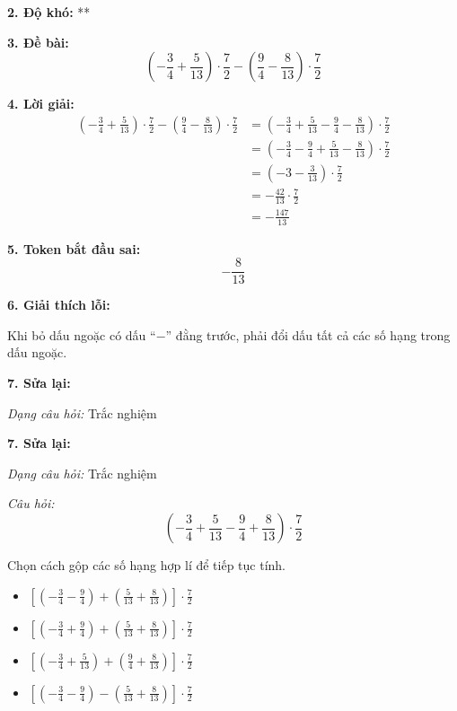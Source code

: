 \noindent\textbf{2. Độ khó:} **

\noindent\textbf{3. Đề bài:}
\[
\left(-\frac{3}{4}+\frac{5}{13}\right)\cdot\frac{7}{2}
-\left(\frac{9}{4}-\frac{8}{13}\right)\cdot\frac{7}{2}
\]

\noindent\textbf{4. Lời giải:}
\begin{align*}
\left(-\frac{3}{4}+\frac{5}{13}\right)\cdot\frac{7}{2}
-\left(\frac{9}{4}-\frac{8}{13}\right)\cdot\frac{7}{2}
&=
\left(-\frac{3}{4}+\frac{5}{13}-\frac{9}{4}-\frac{8}{13}\right)\cdot\frac{7}{2} \\
&=
\left(-\frac{3}{4}-\frac{9}{4}+\frac{5}{13}-\frac{8}{13}\right)\cdot\frac{7}{2} \\
&=
\left(-3-\frac{3}{13}\right)\cdot\frac{7}{2} \\
&=
-\frac{42}{13}\cdot\frac{7}{2} \\
&=
-\frac{147}{13}
\end{align*}

\noindent\textbf{5. Token bắt đầu sai:}
\[
-\frac{8}{13}
\]

\noindent\textbf{6. Giải thích lỗi:}

Khi bỏ dấu ngoặc có dấu ``$-$'' đằng trước, phải đổi dấu tất cả các số hạng trong dấu ngoặc.

\noindent\textbf{7. Sửa lại:}

\textit{Dạng câu hỏi:} Trắc nghiệm

\noindent\textbf{7. Sửa lại:}

\textit{Dạng câu hỏi:} Trắc nghiệm

\textit{Câu hỏi:}
\[
\left(-\frac{3}{4}+\frac{5}{13}-\frac{9}{4}+\frac{8}{13}\right)\cdot\frac{7}{2}
\]

Chọn cách gộp các số hạng hợp lí để tiếp tục tính.

\begin{itemize}
    \item[A.] $\displaystyle
    \left[\left(-\frac34-\frac94\right)
    +\left(\frac5{13}+\frac8{13}\right)\right]\cdot\frac72$

    \item[B.] $\displaystyle
    \left[\left(-\frac34+\frac94\right)
    +\left(\frac5{13}+\frac8{13}\right)\right]\cdot\frac72$

    \item[C.] $\displaystyle
    \left[\left(-\frac34+\frac5{13}\right)
    +\left(\frac94+\frac8{13}\right)\right]\cdot\frac72$

    \item[D.] $\displaystyle
    \left[\left(-\frac34-\frac94\right)
    -\left(\frac5{13}+\frac8{13}\right)\right]\cdot\frac72$
\end{itemize}

